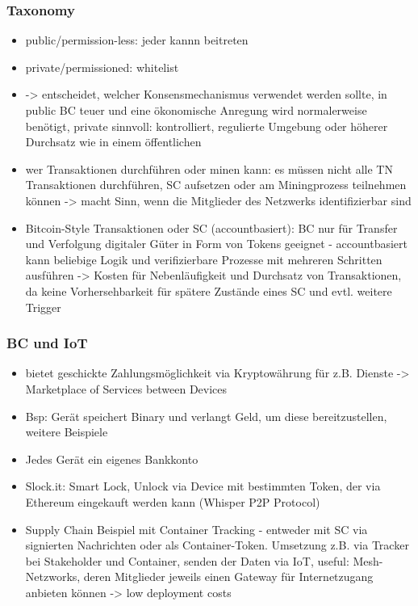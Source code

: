     \subsubsection{Taxonomy}
        \begin{itemize}
            \item public/permission-less: jeder kannn beitreten
            \item private/permissioned: whitelist
            \item -> entscheidet, welcher Konsensmechanismus verwendet werden sollte, in public BC teuer und eine ökonomische Anregung wird normalerweise benötigt, private sinnvoll: kontrolliert, regulierte Umgebung oder höherer Durchsatz wie in einem öffentlichen
            \item wer Transaktionen durchführen oder minen kann: es müssen nicht alle TN Transaktionen durchführen, SC aufsetzen oder am Miningprozess teilnehmen können -> macht Sinn, wenn die Mitglieder des Netzwerks identifizierbar sind
            \item Bitcoin-Style Transaktionen oder SC (accountbasiert): BC nur für Transfer und Verfolgung digitaler Güter in Form von Tokens geeignet - accountbasiert kann beliebige Logik und verifizierbare Prozesse mit mehreren Schritten ausführen -> Kosten für Nebenläufigkeit und Durchsatz von Transaktionen, da keine Vorhersehbarkeit für spätere Zustände eines SC und evtl. weitere Trigger
        \end{itemize}
        
    \subsubsection{BC und IoT}
        \begin{itemize}
            \item bietet geschickte Zahlungsmöglichkeit via Kryptowährung für z.B. Dienste -> Marketplace of Services between Devices
            \item Bsp: Gerät speichert Binary und verlangt Geld, um diese bereitzustellen, weitere Beispiele
            \item Jedes Gerät ein eigenes Bankkonto
            \item Slock.it: Smart Lock, Unlock via Device mit bestimmten Token, der via Ethereum eingekauft werden kann (Whisper P2P Protocol)
            \item Supply Chain Beispiel mit Container Tracking - entweder mit SC via signierten Nachrichten oder als Container-Token. Umsetzung z.B. via Tracker bei Stakeholder und Container, senden der Daten via IoT, useful: Mesh-Netzworks, deren Mitglieder jeweils einen Gateway für Internetzugang anbieten können -> low deployment costs
        \end{itemize}
        
